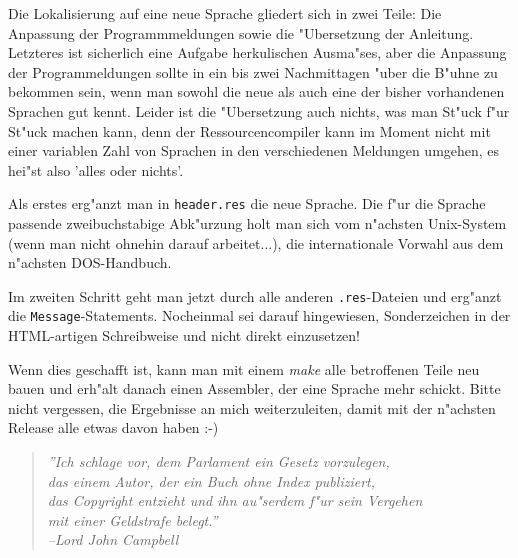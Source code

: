 \documentclass[12pt,a4paper,twoside]{report}
\begin{document}
Die Lokalisierung auf eine neue Sprache gliedert sich in zwei Teile: Die
Anpassung der Programmmeldungen sowie die "Ubersetzung der Anleitung.
Letzteres ist sicherlich eine Aufgabe herkulischen Ausma"ses, aber die
Anpassung der Programmeldungen sollte in ein bis zwei Nachmittagen "uber
die B"uhne zu bekommen sein, wenn man sowohl die neue als auch eine der
bisher vorhandenen Sprachen gut kennt.  Leider ist die "Ubersetzung auch
nichts, was man St"uck f"ur St"uck machen kann, denn der
Ressourcencompiler kann im Moment nicht mit einer variablen Zahl von
Sprachen in den verschiedenen Meldungen umgehen, es hei"st also 'alles
oder nichts'.

Als erstes erg"anzt man in {\tt header.res} die neue Sprache.  Die f"ur
die Sprache passende zweibuchstabige Abk"urzung holt man sich vom
n"achsten Unix-System (wenn man nicht ohnehin darauf arbeitet...), die
internationale Vorwahl aus dem n"achsten DOS-Handbuch.

Im zweiten Schritt geht man jetzt durch alle anderen {\tt .res}-Dateien
und erg"anzt die {\tt Message}-Statements.  Nocheinmal sei darauf
hingewiesen, Sonderzeichen in der HTML-artigen Schreibweise und nicht
direkt einzusetzen!

Wenn dies geschafft ist, kann man mit einem {\em make} alle betroffenen
Teile neu bauen und erh"alt danach einen Assembler, der eine Sprache mehr
schickt.  Bitte nicht vergessen, die Ergebnisse an mich weiterzuleiten,
damit mit der n"achsten Release alle etwas davon haben :-)


\cleardoublepage

\begin{thebibliography}{99}



\end{thebibliography}

\cleardoublepage

\begin{quote}{\it
''Ich schlage vor, dem Parlament ein Gesetz vorzulegen, \\
das einem Autor, der ein Buch ohne Index publiziert, \\
das Copyright entzieht und ihn au"serdem f"ur sein Vergehen \\
mit einer Geldstrafe belegt.''\\
\hspace{2cm} --Lord John Campbell}\end{quote}

\printindex
\end{document}
